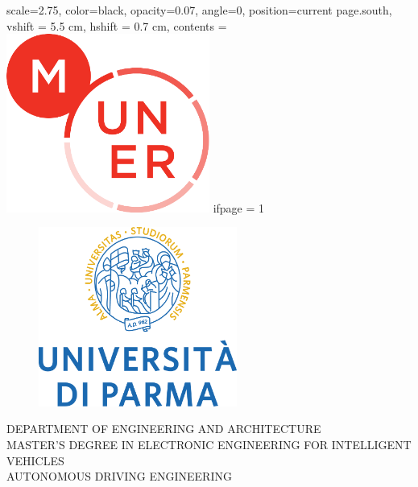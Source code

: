 {
    \backgroundsetup
    {
      scale=2.75,
      color=black,
      opacity=0.07,
      angle=0,
      position=current page.south,
      vshift = 5.5 cm,
      hshift = 0.7 cm,
      contents = {\includegraphics[width=0.5\textwidth]{LateX/figs/LOGO MUNER (2)_764.png}}
      ifpage = 1 
    }
    
    
    \thispagestyle{empty}
    \linespread{1.2}\selectfont
    \mbox{}
    \vspace{-2 cm}
    \begin{center}
    \begin{figure}[h]
    \begin{center}
    \includegraphics[width=6.5cm]{LateX/figs/UNIPR_CENTRATO_2RIGHE_POS_CMYK.png}
    \end{center}
    \end{figure}
    
    \setlength{\headwidth}{\textwidth}
    
    \vspace{0.75 cm}
    \large\textsc{DEPARTMENT OF ENGINEERING AND ARCHITECTURE}\\[5mm]
    \large\textsc{MASTER’S DEGREE IN ELECTRONIC ENGINEERING FOR INTELLIGENT VEHICLES}\\
    \large\textsc{AUTONOMOUS DRIVING ENGINEERING}\\
    

\end{center}}
